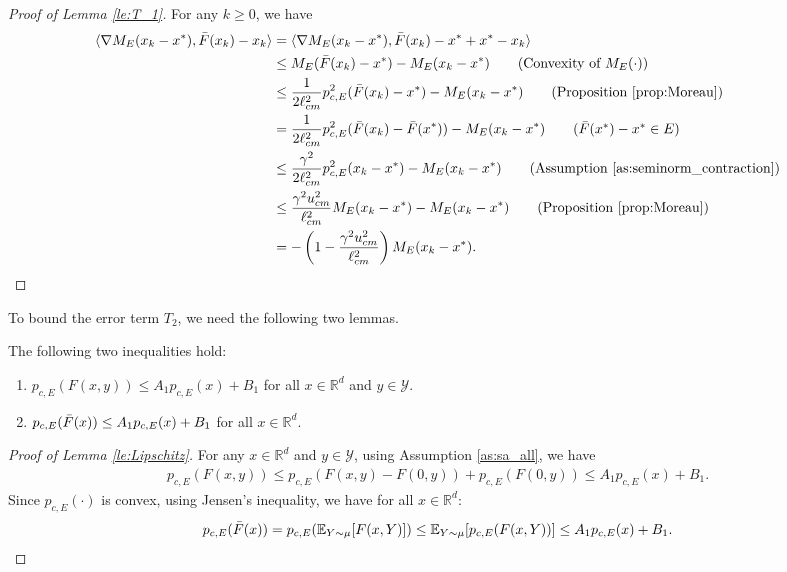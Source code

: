 \documentclass[11 pt]{article}
\begin{document}
	\begin{proof}[Proof of Lemma \ref{le:T_1}]
		For any $k \geq 0$, we have
		\begin{align*}
			\langle\nabla M_E(x_k-x^*),\bar{F}(x_k)-x_k\rangle &= \langle\nabla M_E(x_k-x^*), \bar{F}(x_k) - x^* + x^* - x_k\rangle\\
			&\leq M_E(\bar{F}(x_k) - x^*) - M_E(x_k - x^*) \tag{Convexity of $M_E(\cdot)$}\\
			&\leq \frac{1}{2\ell^2_{cm}}p^2_{c,E}(\bar{F}(x_k) - x^*) - M_E(x_k - x^*) \tag{Proposition \ref{prop:Moreau}}\\
			&= \frac{1}{2\ell^2_{cm}}p^2_{c,E}(\bar{F}(x_k) - \bar{F}(x^*)) - M_E(x_k - x^*) \tag{$\bar{F}(x^*)-x^*\in E$}\\
			&\leq \frac{\gamma^2}{2\ell^2_{cm}}p^2_{c,E}(x_k - x^*) - M_E(x_k - x^*) \tag{Assumption \ref{as:seminorm_contraction}}\\
			&\leq \frac{\gamma^2 u^2_{cm}}{\ell^2_{cm}}M_{E}(x_k - x^*) - M_E(x_k - x^*) \tag{Proposition \ref{prop:Moreau}}\\
			&= -\left(1 - \frac{\gamma^2 u^2_{cm}}{\ell^2_{cm}} \right) M_E(x_k - x^*).
		\end{align*}
	\end{proof}
	
	
	To bound the error term $T_2$, we need the following two lemmas.
	
	\begin{lemma}\label{le:Lipschitz}
		The following two inequalities hold: 
		\begin{enumerate}[(1)]
			\item  $p_{c,E}(F(x,y))\leq A_1p_{c,E}(x)+B_1$ for all $x\in\mathbb{R}^d$ and $y\in\mathcal{Y}$.
			\item $p_{c,E}(\Bar{F}(x))\leq A_1p_{c,E}(x)+B_1$ for all $x\in\mathbb{R}^d$.
		\end{enumerate}
	\end{lemma}
	\begin{proof}[Proof of Lemma \ref{le:Lipschitz}]
		For any $x\in\mathbb{R}^d$ and $y\in\mathcal{Y}$, using Assumption \ref{as:sa_all}, we have
		\begin{align*}
			p_{c,E}(F(x,y))\leq p_{c,E}(F(x,y)-F(0,y))+p_{c,E}(F(0,y))\leq A_1p_{c,E}(x)+B_1.
		\end{align*}
		Since $p_{c,E}(\cdot)$ is convex, using Jensen's inequality, we have for all $x\in\mathbb{R}^d$:
		\begin{align*}
			p_{c,E}(\Bar{F}(x))=p_{c,E}(\mathbb{E}_{Y\sim \mu}[F(x,Y)])\leq \mathbb{E}_{Y\sim \mu}[p_{c,E}(F(x,Y))]\leq A_1p_{c,E}(x)+B_1.
		\end{align*}
	\end{proof}
	
\end{document}
